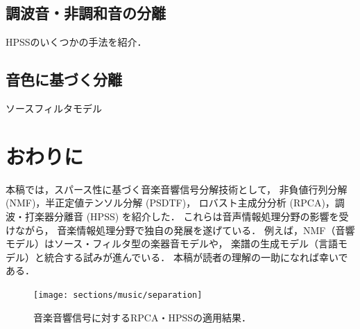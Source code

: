 \subsection{調波音・非調和音の分離}

HPSSのいくつかの手法を紹介．

\subsection{音色に基づく分離}

ソースフィルタモデル

\section{おわりに}

本稿では，スパース性に基づく音楽音響信号分解技術として，
非負値行列分解 (NMF)，半正定値テンソル分解 (PSDTF)，
ロバスト主成分分析 (RPCA)，調波・打楽器分離音 (HPSS) を紹介した．
これらは音声情報処理分野の影響を受けながら，
音楽情報処理分野で独自の発展を遂げている．
例えば，NMF（音響モデル）はソース・フィルタ型の楽器音モデルや，
楽譜の生成モデル（言語モデル）と統合する試みが進んでいる．
本稿が読者の理解の一助になれば幸いである．

\begin{figure}[t]
\centering
\texttt{[image: sections/music/separation]}
\caption{音楽音響信号に対するRPCA・HPSSの適用結果．}
\label{fig:separation}
\end{figure}

%
%

